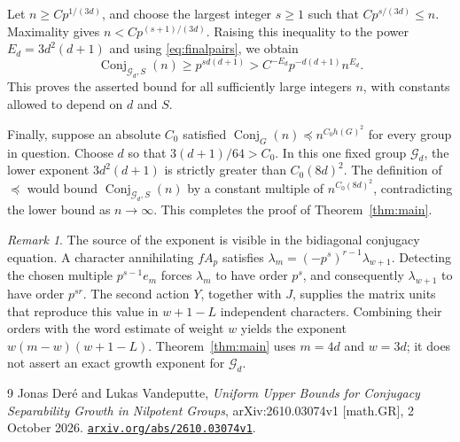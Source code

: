\documentclass[11pt]{article}
\numberwithin{equation}{section}
\theoremstyle{remark}
\newtheorem{remark}[theorem]{Remark}
\newcommand{\Conj}{\operatorname{Conj}}
\newcommand{\Gp}{\mathcal G}
\begin{document}
Let $n\ge C p^{1/(3d)}$, and choose the largest integer $s\ge1$
such that $C p^{s/(3d)}\le n$. Maximality gives
$n<Cp^{(s+1)/(3d)}$. Raising this inequality to the power
$E_d=3d^2(d+1)$ and using \eqref{eq:finalpairs}, we obtain
\[
 \Conj_{\Gp_d,S}(n)
 \ge p^{sd(d+1)}
 > C^{-E_d}p^{-d(d+1)}n^{E_d}.
\]
This proves the asserted bound for all sufficiently large integers
$n$, with constants allowed to depend on $d$ and $S$.

Finally, suppose an absolute $C_0$ satisfied
$\Conj_G(n)\preceq n^{C_0h(G)^2}$ for every group in question.
Choose $d$ so that $3(d+1)/64>C_0$. In this one fixed group
$\Gp_d$, the lower exponent $3d^2(d+1)$ is strictly greater than
$C_0(8d)^2$. The definition of $\preceq$ would bound
$\Conj_{\Gp_d,S}(n)$ by a constant multiple of
$n^{C_0(8d)^2}$, contradicting the lower bound as $n\to\infty$.
This completes the proof of Theorem~\ref{thm:main}.

\begin{remark}
The source of the exponent is visible in the bidiagonal conjugacy
equation. A character annihilating $fA_p$ satisfies
$\lambda_m=(-p^s)^{r-1}\lambda_{w+1}$. Detecting the chosen multiple
$p^{s-1}e_m$ forces $\lambda_m$ to have order $p^s$, and consequently
$\lambda_{w+1}$ to have order $p^{sr}$. The second action $Y$,
together with $J$, supplies the matrix units that reproduce this
value in $w+1-L$ independent characters. Combining their orders with
the word estimate of weight $w$ yields the exponent
$w(m-w)(w+1-L)$. Theorem~\ref{thm:main} uses
$m=4d$ and $w=3d$; it does not assert an exact growth exponent for
$\Gp_d$.
\end{remark}

\begin{thebibliography}{9}
Jonas Der\'e and Lukas Vandeputte,
\emph{Uniform Upper Bounds for Conjugacy Separability Growth in
Nilpotent Groups},
arXiv:2610.03074v1 [math.GR], 2 October 2026.
\href{https://arxiv.org/abs/2610.03074v1}{\texttt{arxiv.org/abs/2610.03074v1}}.
\end{thebibliography}
\end{document}
